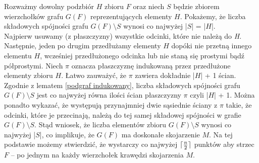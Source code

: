 \documentclass[brudnopis]{xmgr}
\DeclarePairedDelimiter\ceil{\lceil}{\rceil}
\begin{document}
\indent Rozważmy dowolny podzbiór $H$ zbioru $F$ oraz niech $S$ będzie zbiorem wierzchołków grafu $G(F)$ reprezentujących elementy $H$. Pokażemy, że liczba składowych spójności grafu $G(F) \setminus S$ wynosi co najwyżej |$S$| = |$H$|.
\\\indent Najpierw usuwamy (z płaszczyzny) wszystkie odcinki, które nie należą do \textit{H}. Następnie, jeden po drugim przedłużamy elementy $H$ dopóki nie przetną innego elementu $H$, wcześniej przedłużonego odcinka lub nie staną się prostymi bądź półprostymi. Niech $\pi$ oznacza płaszczyznę indukowaną przez przedłużone elementy zbioru $H$. Łatwo zauważyć, że $\pi$ zawiera dokładnie |$H$| + 1 ścian. 
\\\indent Zgodnie z lematem \ref{podgraf indukowany}, liczba składowych spójności grafu $G(F) \setminus S$ jest co najwyżej równa ilości ścian płaszczyzny $\pi$ czyli |$H$| + 1. Można ponadto wykazać, że występują przynajmniej dwie sąsiednie ściany z $\pi$ takie, że odcinki, które je przecinają, należą do tej samej składowej spójności w grafie $G(F) \setminus S$. Stąd wniosek, że liczba elementów zbioru $G(F) \setminus S$ wynosi co najwyżej |$S$|, co implikuje, że $G(F)$ ma doskonałe skojarzenie $M$. Na tej podstawie możemy stwierdzić, że wystarczy co najwyżej $\ceil{\frac{n}{2}}$ punktów aby strzec $F$ -- po jednym na każdy wierzchołek krawędzi skojarzenia $M$.
\end{document}
